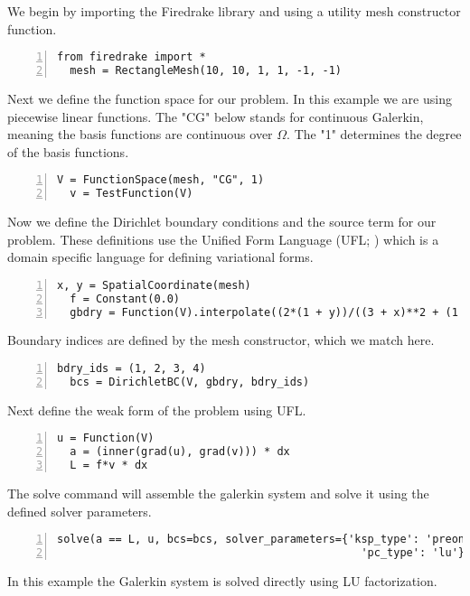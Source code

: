 \documentclass[12 pt]{report}
\begin{document}
We begin by importing the Firedrake library and using a utility mesh constructor function.
\begin{Verbatim}[frame = single,numbers = left,baselinestretch=0.75]
  from firedrake import *
  mesh = RectangleMesh(10, 10, 1, 1, -1, -1)
\end{Verbatim}
Next we define the function space for our problem. In this example we are using piecewise linear functions. The "CG" below stands for continuous Galerkin, meaning the basis functions are continuous over $\Omega$. The "1" determines the degree of the basis functions. 
\begin{Verbatim}[frame = single,numbers = left,baselinestretch=0.75, firstnumber=last]
  V = FunctionSpace(mesh, "CG", 1)
  v = TestFunction(V)
\end{Verbatim}
Now we define the Dirichlet boundary conditions and the source term for our problem. These definitions use the Unified Form Language (UFL; \citep{UnifiedFormLanguage}) which is a domain specific language for defining variational forms. 
\begin{Verbatim}[frame = single,numbers = left,baselinestretch=0.75,firstnumber=last]
  x, y = SpatialCoordinate(mesh)
  f = Constant(0.0)
  gbdry = Function(V).interpolate((2*(1 + y))/((3 + x)**2 + (1 + y)**2))
\end{Verbatim}
Boundary indices are defined by the mesh constructor, which we match here.  
\begin{Verbatim}[frame = single,numbers = left,baselinestretch=0.75,  firstnumber=last]
  bdry_ids = (1, 2, 3, 4) 
  bcs = DirichletBC(V, gbdry, bdry_ids)
\end{Verbatim}
Next define the weak form of the problem using UFL. 
\begin{Verbatim}[frame = single,numbers = left,baselinestretch=0.75, firstnumber=last]
  u = Function(V)
  a = (inner(grad(u), grad(v))) * dx
  L = f*v * dx
\end{Verbatim}
The solve command will assemble the galerkin system and solve it using the defined solver parameters. 
\begin{Verbatim}[frame = single,numbers = left,baselinestretch=0.75, firstnumber=last]
  solve(a == L, u, bcs=bcs, solver_parameters={'ksp_type': 'preonly', 
                                               'pc_type': 'lu'})
\end{Verbatim}
In this example the Galerkin system is solved directly using LU factorization. 
\end{document}
